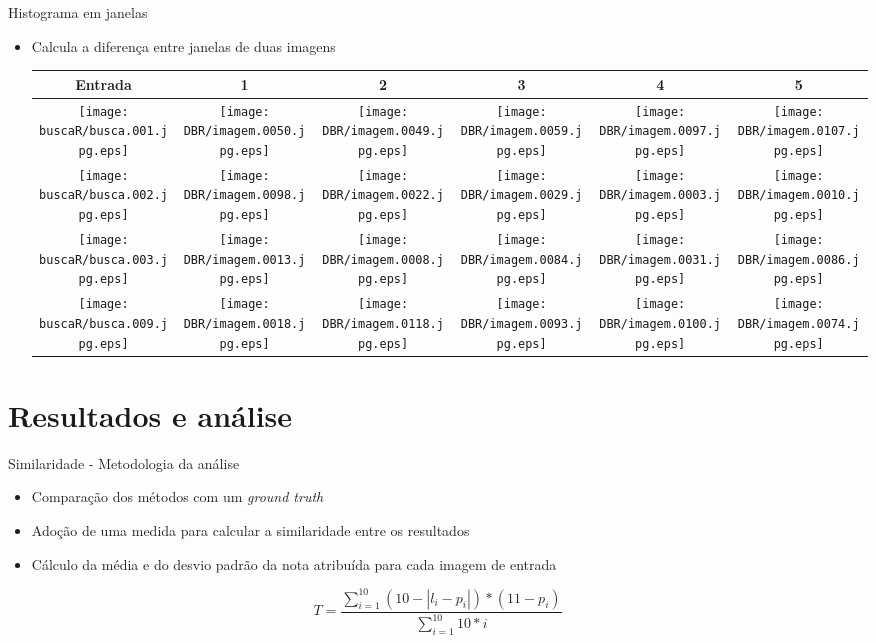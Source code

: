 \documentclass[
    style=paintings,
    paper=screen,
    blackslide,
    nopagebreaks,
    fleqn
]{powerdot}
\begin{document}
\begin{slide}{Histograma em janelas}
\begin{itemize}[type=1]
\item <1-> Calcula a diferença entre janelas de duas imagens
\vspace{-0.8cm}
\begin{table}[H]
\begin{center}
\begin{tabular}{c|ccccc}
\hline 
Entrada & 1 & 2 & 3 & 4 & 5\tabularnewline
\hline
\texttt{[image: buscaR/busca.001.jpg.eps]} & 
\texttt{[image: DBR/imagem.0050.jpg.eps]} & 
\texttt{[image: DBR/imagem.0049.jpg.eps]} & 
\texttt{[image: DBR/imagem.0059.jpg.eps]} & 
\texttt{[image: DBR/imagem.0097.jpg.eps]} &
\texttt{[image: DBR/imagem.0107.jpg.eps]} 
\tabularnewline
\hline 
\texttt{[image: buscaR/busca.002.jpg.eps]} & 
\texttt{[image: DBR/imagem.0098.jpg.eps]} & 
\texttt{[image: DBR/imagem.0022.jpg.eps]} & 
\texttt{[image: DBR/imagem.0029.jpg.eps]} & 
\texttt{[image: DBR/imagem.0003.jpg.eps]} &
\texttt{[image: DBR/imagem.0010.jpg.eps]} 
\tabularnewline
\hline 
\texttt{[image: buscaR/busca.003.jpg.eps]} & 
\texttt{[image: DBR/imagem.0013.jpg.eps]} & 
\texttt{[image: DBR/imagem.0008.jpg.eps]} & 
\texttt{[image: DBR/imagem.0084.jpg.eps]} & 
\texttt{[image: DBR/imagem.0031.jpg.eps]} &
\texttt{[image: DBR/imagem.0086.jpg.eps]} 
\tabularnewline
\hline 
\texttt{[image: buscaR/busca.009.jpg.eps]} & 
\texttt{[image: DBR/imagem.0018.jpg.eps]} & 
\texttt{[image: DBR/imagem.0118.jpg.eps]} & 
\texttt{[image: DBR/imagem.0093.jpg.eps]} & 
\texttt{[image: DBR/imagem.0100.jpg.eps]} &
\texttt{[image: DBR/imagem.0074.jpg.eps]} 
\tabularnewline
\hline 
\end{tabular}
\end{center}
\end{table}
\end{itemize}
\end{slide}


\section[slide=false]{Resultados e análise}
\begin{slide}{Similaridade - Metodologia da análise}
\begin{itemize}[type=1]
\item <1-> Comparação dos métodos com um \it{ground truth}
\item <2-> Adoção de uma medida para calcular a similaridade entre os resultados 
\item <3-> Cálculo da média e do desvio padrão da nota atribuída para cada imagem de entrada 
\end{itemize}
\pause$$T = \frac{\sum\limits_{i=1}^{10}(10-|l_i-p_i|) * (11-p_i)}{\sum\limits_{i=1}^{10}10*i}$$
\end{slide}
\end{document}
